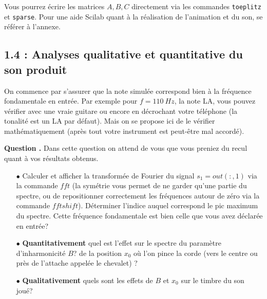 \documentclass[a4,12pt]{article}
\newcounter{Nbquestion}
\newcommand*\question{%
\stepcounter{Nbquestion}%
\textbf{Question \theNbquestion. }}
\begin{document}

Vous pourrez écrire les matrices $A,B,C$ directement via les commandes \verb"toeplitz" et \verb"sparse".
Pour une aide Scilab quant à la réalisation de l'animation et du son, se référer à l'annexe.

\subsection*{1.4 : Analyses qualitative et quantitative du son produit}

On commence par s'assurer que la note simulée correspond bien à la fréquence fondamentale en entrée. Par exemple pour $f=110~Hz$, la note LA, vous pouvez vérifier avec une vraie guitare ou encore en décrochant votre téléphone (la tonalité est un LA par défaut). Mais on se propose ici de le vérifier mathématiquement (après tout votre instrument est peut-être mal accordé). 


  \question Dans cette question on attend de vous que vous preniez du recul quant à vos résultats obtenus.\\

  \begin{itemize}
    \item[$\bullet$] Calculer et afficher la transformée de Fourier du signal $s_1=out(:,1)$ via la commande $fft$ 	(la symétrie vous permet de ne garder qu'une partie du spectre, ou de repositionner correctement les 		fréquences autour de zéro via la commande $fftshift$). Déterminer l'indice auquel correspond le pic maximum 	du spectre. Cette fréquence fondamentale est bien celle que vous avez déclarée en entrée?\\ 
    \item[$\bullet$] \textbf{Quantitativement} quel est l'effet sur le spectre du paramètre d'inharmonicité $B$? de 	la position $x_0$ où l'on pince la corde (vers le centre ou près de l'attache appelée le chevalet) ? \\ 
    \item[$\bullet$] \textbf{Qualitativement} quels sont les effets de $B$ et $x_0$ sur le timbre du son joué?\end{itemize} 


\newpage

\end{document}
